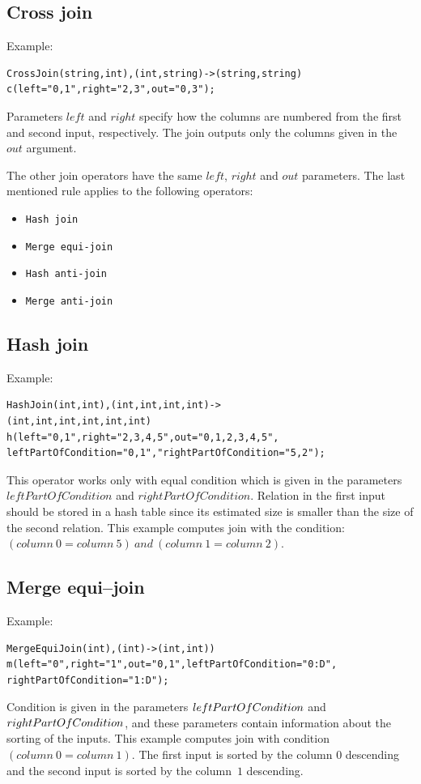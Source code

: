 \subsection{Cross join}
Example:
\begin{lstlisting} 
CrossJoin(string,int),(int,string)->(string,string)
c(left="0,1",right="2,3",out="0,3");
\end{lstlisting}
Parameters $left$ and $right$ specify how the columns are numbered from the first and second input, respectively. The join outputs only the columns given in the $out$ argument. 

The other join operators have the same $left$, $right$ and $out$ parameters. The last mentioned rule applies to the following operators:
\begin{itemize}
\item \texttt{Hash join}
\item \texttt{Merge equi-join}
\item \texttt{Hash anti-join}
\item \texttt{Merge anti-join}
\end{itemize} 

\subsection{Hash join}
Example:
\begin{lstlisting}
HashJoin(int,int),(int,int,int,int)->
(int,int,int,int,int,int)
h(left="0,1",right="2,3,4,5",out="0,1,2,3,4,5",
leftPartOfCondition="0,1","rightPartOfCondition="5,2"); 
\end{lstlisting}
This operator works only with equal condition which is given in the parameters $leftPartOfCondition$ and $rightPartOfCondition$. Relation in the first input should be stored in a hash table since its estimated size is smaller than the size of the second relation. This example computes join with the condition:\\
 $(column~0=column~5)~and~(column~1=column~2)$.

\subsection{Merge equi--join}
Example:
\begin{lstlisting}
MergeEquiJoin(int),(int)->(int,int))
m(left="0",right="1",out="0,1",leftPartOfCondition="0:D",
rightPartOfCondition="1:D");
\end{lstlisting}
Condition is given in the parameters $left\-Part\-Of\-Con\-di\-tion$ and $right\-Part\-Of\-Con\-di\-tion$, and these parameters contain information about the sorting of the inputs. This example computes join with condition $(column~0 = column~1)$. The first input is sorted by the column $0$ descending and the second input is sorted by the column~$1$ descending.

